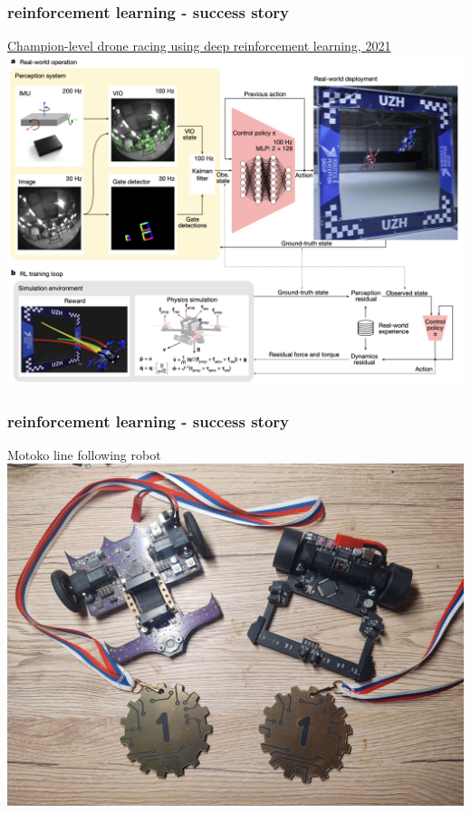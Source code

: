 \documentclass{beamer}
\begin{document}
\begin{frame}
  \frametitle{reinforcement learning - success story}
  
  \href{https://www.nature.com/articles/s41586-023-06419-4}{Champion-level drone racing using deep reinforcement learning, 2021}
  \centering
  \includegraphics[scale=0.3]{../images/rl_drone.png}
    
\end{frame}


\begin{frame}
  \frametitle{reinforcement learning - success story}
  Motoko line following robot \\
  \centering
  \includegraphics[scale=0.07]{../images/medals.jpg}
    
\end{frame}
\end{document}
